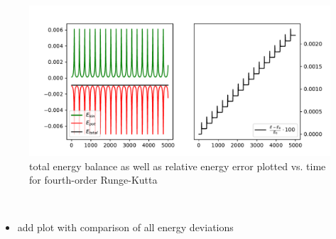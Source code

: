     \begin{figure}[h!]
        \centering
        \includegraphics[width=\textwidth]{./figures/task1_1_energies_rk4.pdf}
        \caption{total energy balance as well as relative energy error plotted 
            vs. time for fourth-order Runge-Kutta}
    \end{figure} \ \\ 

    \begin{itemize}
        \item add plot with comparison of all energy deviations 
    \end{itemize}

